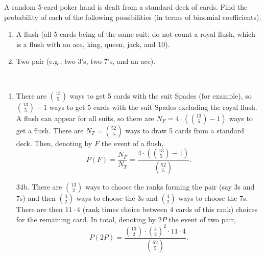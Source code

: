 
\setcounter{theorem}{16}
\begin{exercise}[BH.1.34]
	A random 5-card poker hand is dealt from a standard deck of cards. Find the probability of each of the following possibilities (in terms of binomial coefficients).
	\begin{enumerate}
		\item A flush (all 5 cards being of the same suit; do not count a royal flush, which is a flush with an ace, king, queen, jack, and 10).
		\item Two pair (e.g., two 3’s, two 7’s, and an ace).
	\end{enumerate}
\begin{solution}~
	\begin{enumerate}
		\item There are ${13 \choose 5}$ ways to get 5 cards with the suit Spades (for example), so ${13 \choose 5}-1$ ways to get 5 cards with the suit Spades excluding the royal flush. A flush can appear for all suits, so there are $N_{F}=4\cdot ({13 \choose 5}-1)$ ways to get a flush. There are $N_{T}={52 \choose 5}$ ways to draw 5 cards from a standard deck. Then, denoting by $F$ the event of a flush, $$P(F) = \frac{N_{F}}{N_{T}} = \frac{4 \cdot ({13 \choose 5}-1)}{{52 \choose 5}}.$$
		\item[34b.] There are ${13 \choose 2}$ ways to choose the ranks forming the pair (say 3s and 7s) and then ${4 \choose 2}$ ways to choose the 3s and ${4 \choose 2}$ ways to choose the 7s. There are then $11\cdot 4$ (rank times choice between 4 cards of this rank) choices for the remaining card. In total, denoting by $2P$ the event of two pair,
		$$P(2P) = \frac{{13 \choose 2}\cdot {4 \choose 2}^2 \cdot 11\cdot 4}{{52 \choose 5}}.$$
	\end{enumerate}
\end{solution}
\end{exercise}


